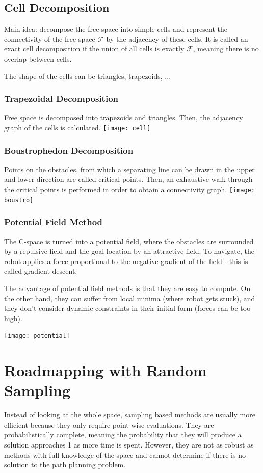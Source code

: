 \begin{multicols*}{2}
\subsection{Cell Decomposition}
Main idea: decompose the free space into simple cells and represent the connectivity of the free space $\mathcal{F}$ by the adjacency of these cells. It is called an exact cell decomposition if the union of all cells is exactly $\mathcal{F}$, meaning there is no overlap between cells. 

The shape of the cells can be triangles, trapezoids, ...

\subsubsection{Trapezoidal Decomposition}
Free space is decomposed into trapezoids and triangles. Then, the adjacency graph of the cells is calculated.
\texttt{[image: cell]}

\subsubsection{Boustrophedon Decomposition}
Points on the obstacles, from which a separating line can be drawn in the upper and lower direction are called critical points. Then, an exhaustive walk through the critical points is performed in order to obtain a connectivity graph.
\texttt{[image: boustro]}

\subsubsection{Potential Field Method}
The C-space is turned into a potential field, where the obstacles are surrounded by a repulsive field and the goal location by an attractive field. To navigate, the robot applies a force proportional to the negative gradient of the field - this is called gradient descent. 

The advantage of potential field methods is that they are easy to compute. On the other hand, they can suffer from local minima (where robot gets stuck), and they don't consider dynamic constraints in their initial form (forces can be too high).

\texttt{[image: potential]}


\section{Roadmapping with Random Sampling}
Instead of looking at the whole space, sampling based methods are usually more efficient because they only require point-wise evaluations. They are probabilistically complete, meaning the probability that they will produce a solution approaches 1 as more time is spent. However, they are not as robust as methods with full knowledge of the space and cannot determine if there is no solution to the path planning problem.


\end{multicols*}
